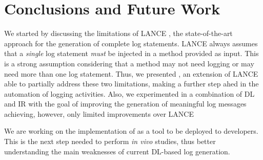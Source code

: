 \section{Conclusions and Future Work} \label{sec:conclusions}

We started by discussing the limitations of LANCE \cite{mastropaolo2022using}, the state-of-the-art approach for the generation of complete log statements. LANCE always assumes that a \emph{single} log statement \emph{must} be injected in a method provided as input. This is a strong assumption considering that a method may not need logging or may need more than one log statement. Thus, we presented \approach, an extension of LANCE able to partially address these two limitations, making a further step ahed in the automation of logging activities. Also, we experimented in \approach a combination of DL and IR with the goal of improving the generation of meaningful log messages achieving, however, only limited improvements over LANCE

We are working on the implementation of \approach as a tool to be deployed to developers. This is the next step needed to perform \emph{in vivo} studies, thus better understanding the main weaknesses of current DL-based log generation. 

